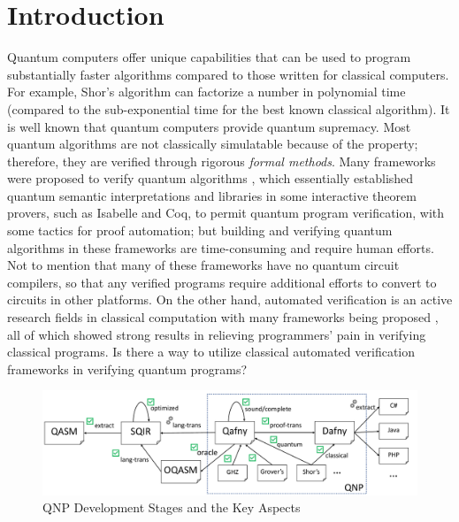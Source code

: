 \section{Introduction}
\label{sec:intro}


Quantum computers offer unique capabilities that can be used to
program substantially faster algorithms compared to those written for
classical computers.
For example, Shor's algorithm \cite{shors} can factorize a
number in polynomial time (compared to the sub-exponential time for the
best known classical algorithm).
It is well known that quantum computers provide quantum supremacy.
Most quantum algorithms are not classically simulatable because of the property;
therefore, they are verified through rigorous \emph{formal methods}.
Many frameworks were proposed to verify quantum algorithms \cite{qhoreusage,qhoare,qbricks,qsepa,qseplocal,VOQC}, 
which essentially established quantum semantic interpretations and libraries in some interactive theorem provers,
such as Isabelle and Coq, to permit quantum program verification, with some tactics for proof automation; but building and verifying quantum algorithms in these frameworks are time-consuming and require human efforts. 
Not to mention that many of these frameworks have no quantum circuit compilers,
so that any verified programs require additional efforts to convert to circuits in other platforms. 
On the other hand, automated verification is an active research fields in classical computation with many frameworks being proposed \cite{HoareLogic,separationlogic,nat-proof-fun,nat-proof,nat-proof-frame,10.1145/3453483.3454087,arxiv.1609.00919,martioliet00rewriting,rosu-stefanescu-2011-nier-icse,rosu-stefanescu-ciobaca-moore-2013-lics,10.1007/978-3-642-17511-4_20,10.1007/978-3-642-03359-9_2}, all of which showed strong results in relieving programmers' pain in verifying classical programs. Is there a way to utilize classical automated verification frameworks in verifying quantum programs?


\begin{figure}[t]
  \includegraphics[width=.8\textwidth]{qnp.pdf}
  \caption{QNP Development Stages and the Key Aspects}
\label{fig:arch}
\end{figure}

